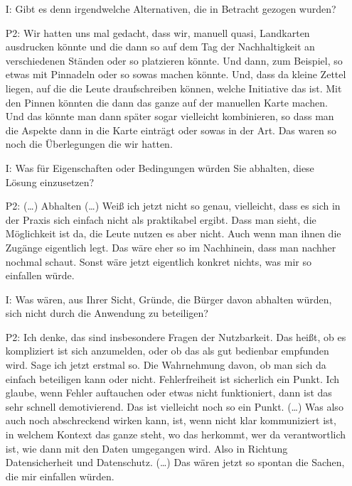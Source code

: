 \begin{itemize}
    \item[I:] Gibt es denn irgendwelche Alternativen, die in Betracht gezogen wurden?
    \item[P2:] Wir hatten uns mal gedacht, dass wir, manuell quasi, Landkarten ausdrucken k{\"o}nnte und die dann so auf dem Tag der Nachhaltigkeit an verschiedenen St{\"a}nden oder so platzieren k{\"o}nnte. Und dann, zum Beispiel, so etwas mit Pinnadeln oder so sowas machen k{\"o}nnte. Und, dass da kleine Zettel liegen, auf die die Leute draufschreiben k{\"o}nnen, welche Initiative das ist. Mit den Pinnen k{\"o}nnten die dann das ganze auf der manuellen Karte machen. Und das k{\"o}nnte man dann sp{\"a}ter sogar vielleicht kombinieren, so dass man die Aspekte dann in die Karte eintr{\"a}gt oder sowas in der Art. Das waren so noch die {\"U}berlegungen die wir hatten.
    \item[I:] Was f{\"u}r Eigenschaften oder Bedingungen w{\"u}rden Sie abhalten, diese L{\"o}sung einzusetzen?
    \item[P2:] (\dots) Abhalten (\dots) Wei{\ss} ich jetzt nicht so genau, vielleicht, dass es sich in der Praxis sich einfach nicht als praktikabel ergibt. Dass man sieht, die M{\"o}glichkeit ist da, die Leute nutzen es aber nicht. Auch wenn man ihnen die Zug{\"a}nge eigentlich legt. Das w{\"a}re eher so im Nachhinein, dass man nachher nochmal schaut. Sonst w{\"a}re jetzt eigentlich konkret nichts, was mir so einfallen w{\"u}rde.
    \item[I:] Was w{\"a}ren, aus Ihrer Sicht, Gr{\"u}nde, die B{\"u}rger davon abhalten w{\"u}rden, sich nicht durch die Anwendung zu beteiligen?
    \item[P2:] Ich denke, das sind insbesondere Fragen der Nutzbarkeit. Das hei{\ss}t, ob es kompliziert ist sich anzumelden, oder ob das als gut bedienbar empfunden wird. Sage ich jetzt erstmal so. Die Wahrnehmung davon, ob man sich da einfach beteiligen kann oder nicht. Fehlerfreiheit ist sicherlich ein Punkt. Ich glaube, wenn Fehler auftauchen oder etwas nicht funktioniert, dann ist das sehr schnell demotivierend. Das ist vielleicht noch so ein Punkt. (\dots) Was also auch noch abschreckend wirken kann, ist, wenn nicht klar kommuniziert ist, in welchem Kontext das ganze steht, wo das herkommt, wer da verantwortlich ist, wie dann mit den Daten umgegangen wird. Also in Richtung Datensicherheit und Datenschutz. (\dots) Das w{\"a}ren jetzt so spontan die Sachen, die mir einfallen w{\"u}rden.
\end{itemize}

